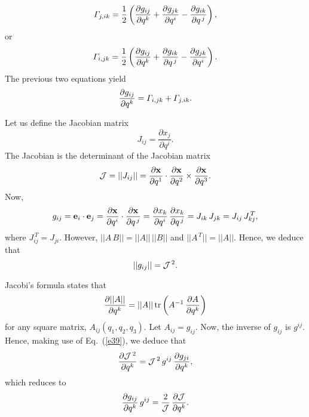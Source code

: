 \documentclass[12pt,prb,aps,notitlepage]{revtex4-1}
\begin{document}
\begin{equation}
 {\mit\Gamma}_{j,ik}=\frac{1}{2}\left(\frac{\partial g_{ij}}{\partial q^k} + \frac{\partial g_{jk}}{\partial q^i} -\frac{\partial g_{ik}}{\partial q^{\,j}}\right),
 \end{equation}
 or 
 \begin{equation}
 {\mit\Gamma}_{i,jk}=\frac{1}{2}\left(\frac{\partial g_{ij}}{\partial q^k} + \frac{\partial g_{ik}}{\partial q^{\,j}} -\frac{\partial g_{jk}}{\partial q^{i}}\right).
 \end{equation}
 The previous two equations yield
 \begin{equation}\label{e35}
 \frac{\partial g_{ij}}{\partial q^k} = {\mit\Gamma}_{i,jk} + {\mit\Gamma}_{j,ik}.
 \end{equation}
 
 Let us define the Jacobian matrix
 \begin{equation}
 J_{ij} = \frac{\partial x_j}{\partial q^i}.
 \end{equation}
 The Jacobian is the determinant of the Jacobian matrix
 \begin{equation}
 {\cal J} = ||J_{ij}||= \frac{\partial{\bf x}}{\partial q^1}\cdot\frac{\partial {\bf x}}{\partial q^2}\times\frac{\partial{\bf x}}{\partial q^3}.
 \end{equation}
 Now,
 \begin{equation}
 g_{ij} = {\bf e}_i\cdot{\bf e}_j= \frac{\partial{\bf x}}{\partial q^i}\cdot\frac{{\partial {\bf x}}}{\partial q^{\,j}}= \frac{\partial x_k}{\partial q^i}\,\frac{{\partial x_k}}{\partial q^{\,j}}= J_{ik}\,J_{jk} = J_{ij}\,J^{\,T}_{kj},
 \end{equation}
 where $J^{\,T}_{ij}= J_{ji}$. However, $||A\,B|| = ||A||\,||B||$ and $||A^{\,T}|| = ||A||$. Hence, we deduce that
 \begin{equation}\label{e39}
 ||g_{ij}|| = {\cal J}^{\,2}.
 \end{equation}
 
 Jacobi's formula states that
 \begin{equation}
 \frac{\partial ||A||}{\partial q^k} = ||A||\,{\rm tr}\left(A^{-1}\,\frac{\partial A}{\partial q^k}\right)
 \end{equation}
 for any square matrix, $A_{ij}(q_1,q_2,q_3)$. 
 Let $A_{ij}= g_{ij}$. Now, the inverse of $g_{ij}$ is $g^{ij}$. Hence, making use of Eq.~(\ref{e39}), we deduce that
 \begin{equation}
 \frac{\partial{\cal J}^{\,2}}{\partial q^k} = {\cal J}^{\,2}\,g^{ij}\,\frac{\partial g_{ji}}{\partial q^k},
 \end{equation}
 which reduces to
 \begin{equation}\label{e42}
 \frac{\partial g_{ij}}{\partial q^k}\,g^{ij} = \frac{2}{\cal J}\,\frac{\partial{\cal J}}{\partial q^k}.
 \end{equation}
 
\end{document}
